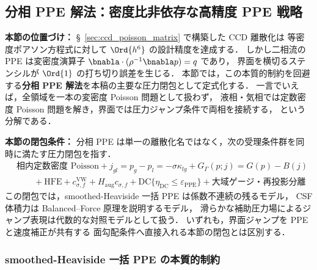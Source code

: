 %
\subsection{分相 PPE 解法：密度比非依存な高精度 PPE 戦略}
\label{sec:split_ppe_framework}
\label{sec:split_ppe_motivation}%
\label{sec:gfm_numerical_motivation}%

\noindent\textbf{本節の位置づけ：}
§~\ref{sec:ccd_poisson_matrix} で構築した CCD 離散化は
等密度ポアソン方程式に対して $\Ord{h^6}$ の設計精度を達成する．
しかし二相流の PPE は変密度演算子 $\bnabla\cdot(\rho^{-1}\bnabla p) = q$ であり，
界面を横切るステンシルが $\Ord{1}$ の打ち切り誤差を生じる．
本節では，この本質的制約を回避する\textbf{分相 PPE 解法}を本稿の主要な圧力閉包として定式化する．
一言でいえば，全領域を一本の変密度 Poisson 問題として扱わず，
液相・気相では定数密度 Poisson 問題を解き，界面では圧力ジャンプ条件で両相を接続する，
という分解である．

\noindent\textbf{本節の閉包条件：}
分相 PPE は単一の離散化名ではなく，次の受理条件群を同時に満たす圧力閉包を指す．
\[
\begin{aligned}
  &\text{相内定数密度 Poisson}
  + j_{gl}=p_g-p_l=-\sigma\kappa_{lg}
  + G_\Gamma(p;j)=G(p)-B(j)\\
  &\qquad
  + \mathrm{HFE}
  + c_{\sigma,f}^{\mathrm{VW}} + H_{\mathrm{aug}}c_{\sigma,f}
  + \mathrm{DC}\{\eta_{\mathrm{DC}}\le\varepsilon_{\mathrm{PPE}}\}
  + \text{大域ゲージ・再投影分離}
\end{aligned}
\]
この閉包では，smoothed-Heaviside 一括 PPE は係数不連続の残るモデル，
CSF 体積力は Balanced--Force 原理を説明するモデル，
滑らかな補助圧力場によるジャンプ表現は代数的な対照モデルとして扱う．
いずれも，界面ジャンプを PPE と速度補正が共有する
面勾配条件へ直接入れる本節の閉包とは区別する．

\subsubsection{smoothed-Heaviside 一括 PPE の本質的制約}
\label{sec:monolithic_ppe_limitation}

